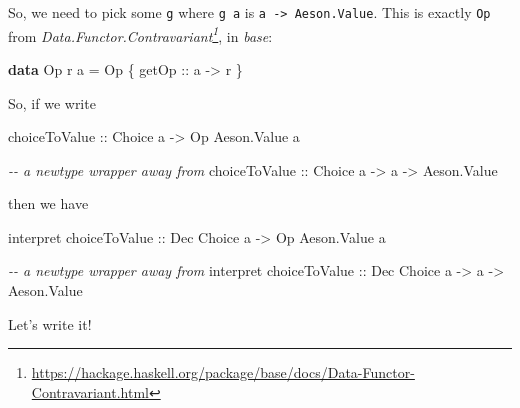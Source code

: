 \documentclass[]{article}
\newenvironment{Shaded}{}{}
\newcommand{\CommentTok}[1]{\textcolor[rgb]{0.38,0.63,0.69}{\textit{#1}}}
\newcommand{\DataTypeTok}[1]{\textcolor[rgb]{0.56,0.13,0.00}{#1}}
\newcommand{\KeywordTok}[1]{\textcolor[rgb]{0.00,0.44,0.13}{\textbf{#1}}}
\newcommand{\NormalTok}[1]{#1}
\newcommand{\OperatorTok}[1]{\textcolor[rgb]{0.40,0.40,0.40}{#1}}
\newcommand{\OtherTok}[1]{\textcolor[rgb]{0.00,0.44,0.13}{#1}}
\newcommand{\StringTok}[1]{\textcolor[rgb]{0.25,0.44,0.63}{#1}}
\renewcommand{\href}[2]{#2\footnote{\url{#1}}}
\begin{document}
So, we need to pick some \texttt{g} where \texttt{g\ a} is
\texttt{a\ -\textgreater{}\ Aeson.Value}. This is exactly \texttt{Op} from
\emph{\href{https://hackage.haskell.org/package/base/docs/Data-Functor-Contravariant.html}{Data.Functor.Contravariant}},
in \emph{base}:

\begin{Shaded}
\begin{Highlighting}[]
\KeywordTok{data} \DataTypeTok{Op}\NormalTok{ r a }\OtherTok{=} \DataTypeTok{Op}\NormalTok{ \{}\OtherTok{ getOp ::}\NormalTok{ a }\OtherTok{{-}>}\NormalTok{ r \}}
\end{Highlighting}
\end{Shaded}

So, if we write

\begin{Shaded}
\begin{Highlighting}[]
\OtherTok{choiceToValue ::} \DataTypeTok{Choice}\NormalTok{ a }\OtherTok{{-}>} \DataTypeTok{Op} \DataTypeTok{Aeson.Value}\NormalTok{ a}

\CommentTok{{-}{-} a newtype wrapper away from}
\OtherTok{choiceToValue ::} \DataTypeTok{Choice}\NormalTok{ a }\OtherTok{{-}>}\NormalTok{ a }\OtherTok{{-}>} \DataTypeTok{Aeson.Value}
\end{Highlighting}
\end{Shaded}

then we have

\begin{Shaded}
\begin{Highlighting}[]
\NormalTok{interpret}\OtherTok{ choiceToValue ::} \DataTypeTok{Dec} \DataTypeTok{Choice}\NormalTok{ a }\OtherTok{{-}>} \DataTypeTok{Op} \DataTypeTok{Aeson.Value}\NormalTok{ a}

\CommentTok{{-}{-} a newtype wrapper away from}
\NormalTok{interpret}\OtherTok{ choiceToValue ::} \DataTypeTok{Dec} \DataTypeTok{Choice}\NormalTok{ a }\OtherTok{{-}>}\NormalTok{ a }\OtherTok{{-}>} \DataTypeTok{Aeson.Value}
\end{Highlighting}
\end{Shaded}

Let's write it!

\begin{Shaded}
\end{Shaded}
\end{document}
